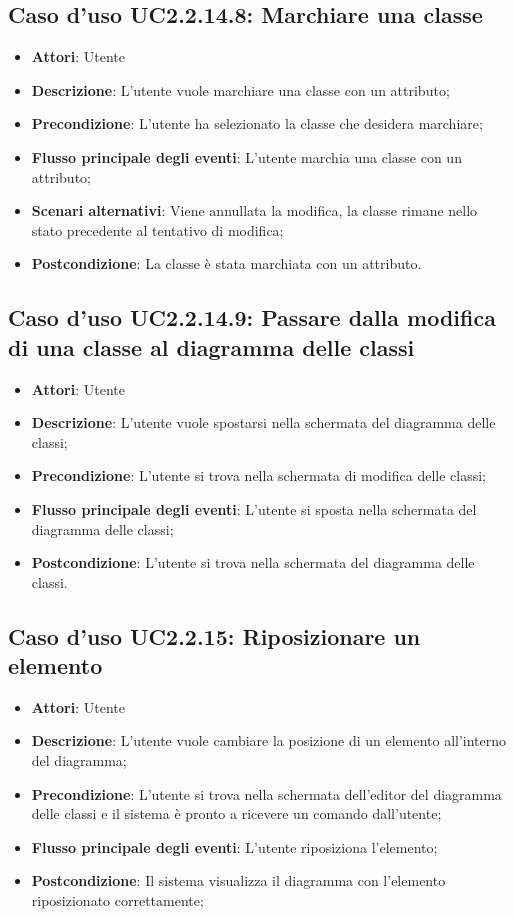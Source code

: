 \documentclass[../AnalisiDeiRequisiti.tex]{subfiles}
\begin{document}
			\subsection{Caso d'uso UC2.2.14.8: Marchiare una classe}
			\begin{itemize}
				\item \textbf{Attori}: Utente
				\item \textbf{Descrizione}: L'utente vuole marchiare una classe con un attributo;
				\item \textbf{Precondizione}: L'utente ha selezionato la classe che desidera marchiare;
				\item \textbf{Flusso principale degli eventi}: L'utente marchia una classe con un attributo;
				\item \textbf{Scenari alternativi}: Viene annullata la modifica, la classe rimane nello stato precedente al tentativo di modifica;
				\item \textbf{Postcondizione}: La classe è stata marchiata con un attributo.
			\end{itemize}
			\subsection{Caso d'uso UC2.2.14.9: Passare dalla modifica di una classe al diagramma delle classi}
			\begin{itemize}
				\item \textbf{Attori}: Utente
				\item \textbf{Descrizione}: L'utente vuole spostarsi nella schermata del diagramma delle classi;
				\item \textbf{Precondizione}: L'utente si trova nella schermata di modifica delle classi;
				\item \textbf{Flusso principale degli eventi}: L'utente si sposta nella schermata del diagramma delle classi;
				\item \textbf{Postcondizione}: L'utente si trova nella schermata del diagramma delle classi.
			\end{itemize}
			\subsection{Caso d'uso UC2.2.15: Riposizionare un elemento}
			\begin{itemize}
				\item \textbf{Attori}: Utente
				\item \textbf{Descrizione}: L'utente vuole cambiare la posizione di un elemento all'interno del diagramma;
				\item \textbf{Precondizione}: L'utente si trova nella schermata dell'editor del diagramma delle classi e il sistema è pronto a ricevere un comando dall'utente;
				\item \textbf{Flusso principale degli eventi}: L'utente riposiziona l'elemento;
				\item \textbf{Postcondizione}: Il sistema visualizza il diagramma con l'elemento riposizionato correttamente;
			\end{itemize}
\end{document}
